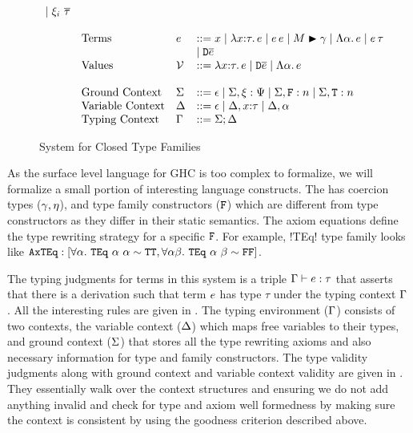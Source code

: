 \documentclass[format=acmsmall,manuscript,review,screen,nonacm,margin=1in,11pt]{acmart}
\begin{document}
\begin{figure}[ht]
\[\begin{array}{l l l l l}
                                        \mathrel{\mid} \xi_{i}~{\overline{\tau}} & \\
      \\
      &\text{Terms}      & e        &\mathrel{{:}{:}{=}} x \mathrel{\mid} \lambda x{:}\tau.\, e \mathrel{\mid} e\,e \mathrel{\mid}M\mathrel{\blacktriangleright}\gamma 
                                        \mathrel{\mid} \Lambda \alpha.\, e \mathrel{\mid} e\,\tau  \\
      &                  &            & \mathrel{\mid} \texttt{D}\overline{e} \\
      &\text{Values}     &\mathcal{V}        &\mathrel{{:}{:}{=}} \lambda x{:}\tau.\, e \mathrel{\mid} \texttt{D}\overline{e} \mathrel{\mid} \Lambda \alpha.\, e\\
      \\
      &\text{Ground Context} &\Sigma   &\mathrel{{:}{:}{=}} \epsilon \mathrel{\mid} \Sigma,\xi:\Psi
                                        \mathrel{\mid} \Sigma,\texttt{F}:n \mathrel{\mid} \Sigma,\texttt{T}:n\\
      &\text{Variable Context}&\Delta  &\mathrel{{:}{:}{=}} \epsilon \mathrel{\mid} \Delta,x{:}\tau \mathrel{\mid} \Delta,\alpha\\
      &\text{Typing Context}  &\Gamma  &\mathrel{{:}{:}{=}} \Sigma;\Delta\\
    \end{array}
  \]
  \caption[\CLTF{}]{System for Closed Type Families}
  \label{fig:syntax-tf-closed}
\end{figure}
As the surface level language for GHC is too complex to formalize, we will formalize a small portion
of interesting language constructs. The \CLTF has coercion types ($\gamma,\eta$), and 
type family constructors ($\texttt{F}$) which are different from type constructors as they differ in their
static semantics. The axiom equations define the type rewriting strategy for a specific $\texttt{F}$.
For example, !TEq! type family looks like $\texttt{AxTEq}: [\forall\alpha.~{\texttt{TEq}~\alpha~\alpha} \mathrel{\sim} \texttt{TT}
, \forall\alpha\beta.~{\texttt{TEq}~\alpha~\beta} \mathrel{\sim} \texttt{FF}]$.

The typing judgments for terms in this system is a triple $\Gamma \vdash e : \tau$ that asserts that
there is a derivation such that term $e$ has type $\tau$ under the typing context $\Gamma$. All the interesting
rules are given in . The typing environment ($\Gamma$) consists of two contexts,
the variable context ($\Delta$) which maps free variables to their types, and ground context ($\Sigma$)
that stores all the type rewriting axioms and also necessary information for type and family constructors.
The type validity judgments along with ground context and variable context validity are given
in . They essentially walk over the context structures
and ensuring we do not add anything invalid and check for type and axiom well formedness by making sure
the context is consistent by using the goodness criterion described above.
\end{document}
